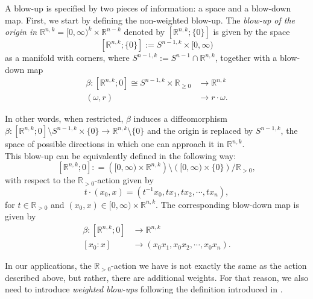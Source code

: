 \documentclass[a4paper,11pt]{article}
\def\R{\mathbb{R}}
\begin{document}
A blow-up is specified by two pieces of information: a space and a blow-down map. First, we start by defining the non-weighted blow-up.  The \emph{blow-up of the origin in \(\mathbb{R}^{n,k} = [0, \infty)^k \times \R^{n-k}\)} denoted by $[\mathbb{R}^{n,k} ; \{0\}]$ is given by the space 
$$
[\mathbb{R}^{n,k} ; \{0\}] := S^{n-1,k} \times [0, \infty)
$$
as a manifold with corners, where $S^{n-1,k} := S^{n-1} \cap \R^{n,k}$, together with a blow-down map 
\begin{align*}
\beta : [\R^{n,k};0] \cong S^{n-1,k} \times \R_{\geq 0} &\rightarrow \R^{n,k} \\ (\omega,r) & \rightarrow r\cdot \omega.
\end{align*}

In other words, when restricted, $\beta$ induces a diffeomorphism $\beta : [\R^{n,k};0] \setminus S^{n-1,k} \times \{ 0\} \rightarrow \R^{n,k} \setminus \{ 0\}$
and the origin is replaced by \(S^{n-1,k}\), the space of possible directions in which one can approach it in $\R^{n,k}$.\\

This blow-up can be equivalently defined in the following way:
$$
[\R^{n,k};0] : = \left( [0, \infty) \times \R^{n,k} \right) \setminus \left( [0, \infty) \times \{ 0\}\right) / \R_{>0},
$$
with respect to the $\R_{>0}$-action given by 
$$
t \cdot (x_0, x) = \left( t^{-1} x_0, t x_1, t x_2, \cdots, t x_n \right),
$$
for $t \in \R_{>0}$ and $(x_0, x) \in [0, \infty) \times \R^{n,k}$. The corresponding blow-down map is given by 
\begin{align*}
\beta : [\R^{n,k};0] &\rightarrow \R^{n,k} \\ [x_0 : x] & \rightarrow (x_0 x_1, x_0 x_2, \cdots, x_0 x_n ).
\end{align*}

In our applications, the $\R_{>0}$-action we have is not exactly the same as the action described above, but rather, there are additional weights. For that reason, we also need to introduce \emph{weighted blow-ups} following the definition introduced in \cite{conlon2023warped}. 
\end{document}
